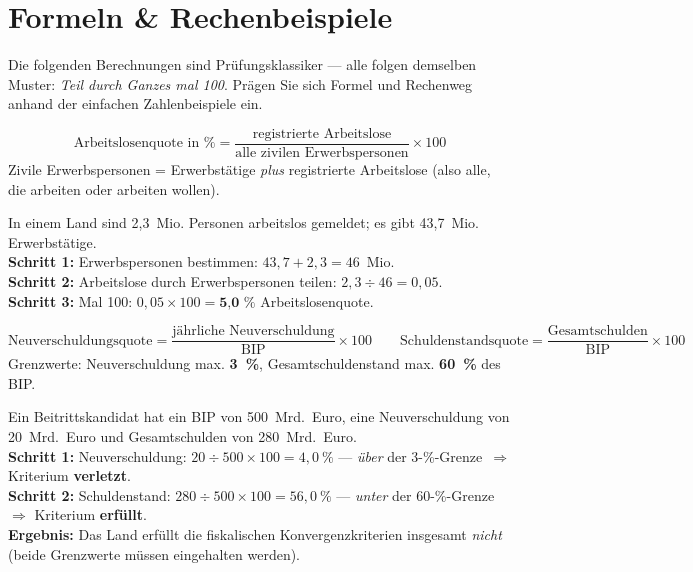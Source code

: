 \documentclass[11pt, a4paper]{article}
\begin{document}
\section{Formeln \& Rechenbeispiele}

Die folgenden Berechnungen sind Prüfungsklassiker --- alle folgen demselben Muster:
\emph{Teil durch Ganzes mal 100}. Prägen Sie sich Formel und Rechenweg anhand der
einfachen Zahlenbeispiele ein.

\begin{merksatz}[title={\bfseries Formel: Arbeitslosenquote}]
\[
\text{Arbeitslosenquote in \%} =
\frac{\text{registrierte Arbeitslose}}{\text{alle zivilen Erwerbspersonen}} \times 100
\]
Zivile Erwerbspersonen = Erwerbstätige \emph{plus} registrierte Arbeitslose (also alle,
die arbeiten oder arbeiten wollen).
\end{merksatz}

\begin{beispiel}
In einem Land sind 2,3~Mio. Personen arbeitslos gemeldet; es gibt 43,7~Mio. Erwerbstätige.\\[0.3em]
\textbf{Schritt 1:} Erwerbspersonen bestimmen: $43{,}7 + 2{,}3 = 46$~Mio.\\
\textbf{Schritt 2:} Arbeitslose durch Erwerbspersonen teilen: $2{,}3 \div 46 = 0{,}05$.\\
\textbf{Schritt 3:} Mal 100: $0{,}05 \times 100 = \textbf{5{,}0~\%}$ Arbeitslosenquote.
\end{beispiel}

\begin{merksatz}[title={\bfseries Anwendung: Konvergenzkriterien nachrechnen (3~\% / 60~\%)}]
\[
\text{Neuverschuldungsquote} = \frac{\text{jährliche Neuverschuldung}}{\text{BIP}} \times 100
\qquad
\text{Schuldenstandsquote} = \frac{\text{Gesamtschulden}}{\text{BIP}} \times 100
\]
Grenzwerte: Neuverschuldung max. \textbf{3~\%}, Gesamtschuldenstand max. \textbf{60~\%}
des BIP.
\end{merksatz}

\begin{beispiel}
Ein Beitrittskandidat hat ein BIP von 500~Mrd.~Euro, eine Neuverschuldung von
20~Mrd.~Euro und Gesamtschulden von 280~Mrd.~Euro.\\[0.3em]
\textbf{Schritt 1:} Neuverschuldung: $20 \div 500 \times 100 = 4{,}0~\%$ ---
\emph{über} der 3-\%-Grenze~$\Rightarrow$ Kriterium \textbf{verletzt}.\\
\textbf{Schritt 2:} Schuldenstand: $280 \div 500 \times 100 = 56{,}0~\%$ ---
\emph{unter} der 60-\%-Grenze~$\Rightarrow$ Kriterium \textbf{erfüllt}.\\
\textbf{Ergebnis:} Das Land erfüllt die fiskalischen Konvergenzkriterien insgesamt
\emph{nicht} (beide Grenzwerte müssen eingehalten werden).
\end{beispiel}
\end{document}
